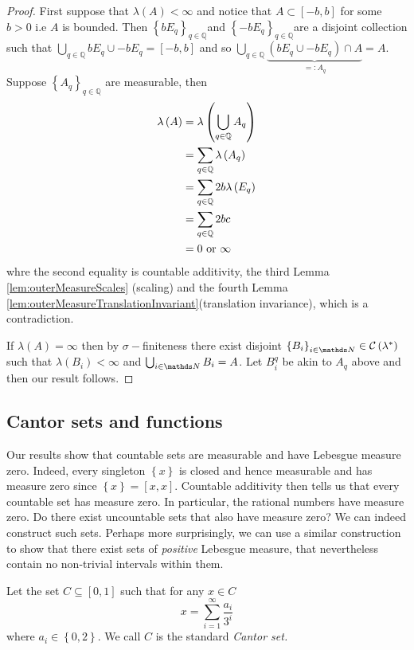 \begin{proof}
First suppose that $\lambda\left(A\right)<\infty$ and notice that
$A\subset\left[-b,b\right]$ for some $b>0$ i.e $A$ is bounded.
Then $\left\{ bE_{q}\right\} _{q\in\mathbb{Q}}$and $\left\{ -bE_{q}\right\} _{q\in\mathbb{Q}}$are
a disjoint collection such that $\bigcup_{q\in\mathbb{Q}}bE_{q}\cup-bE_{q}=\left[-b,b\right]$
and so $\bigcup_{q\in\mathbb{Q}}\underbrace{\left(bE_{q}\cup-bE_{q}\right)\cap A}_{=:A_{q}}=A$.
Suppose $\left\{ A_{q}\right\} _{q\in\mathbb{Q}}$ are measurable,
then
\begin{align*}
\lambda\left(A\right) & =\lambda\left(\bigcup_{q\in\mathbb{Q}}A_{q}\right)\\
 & =\sum_{q\in\mathbb{Q}}\lambda\left(A_{q}\right)\\
 & =\sum_{q\in\mathbb{Q}}2b\lambda\left(E_{q}\right)\\
 & =\sum_{q\in\mathbb{Q}}2bc\\
 & =0\ \text{or \ensuremath{\infty}}
\end{align*}
whre the second equality is countable additivity, the third Lemma
\ref{lem:outerMeasureScales} (scaling) and the fourth Lemma \ref{lem:outerMeasureTranslationInvariant}(translation
invariance), which is a contradiction.

If $\lambda\left(A\right)=\infty$ then by $\sigma-$finiteness there
exist disjoint $\left\{ B_{i}\right\} _{i\in\N}\in\mathcal{C}\left(\lambda^{*}\right)$
such that $\lambda\left(B_{i}\right)<\infty$ and $\bigcup_{i\in\N}B_{i}=A$.
Let $B_{i}^{q}$ be akin to $A_{q}$ above and then our result follows.
\end{proof}

\subsection{Cantor sets and functions\label{subsec:cantorSets}}

Our results show that countable sets are measurable and have Lebesgue
measure zero. Indeed, every singleton $\left\{ x\right\} $ is closed
and hence measurable and has measure zero since $\left\{ x\right\} =\left[x,x\right].$
Countable additivity then tells us that every countable set has measure
zero. In particular, the rational numbers have measure zero. Do there
exist uncountable sets that also have measure zero? We can indeed
construct such sets. Perhaps more surprisingly, we can use a similar
construction to show that there exist sets of \emph{positive }Lebesgue
measure, that nevertheless contain no non-trivial intervals within
them.
\begin{defn}
\label{def:cantorSet}Let the set $C\subseteq\left[0,1\right]$ such
that for any $x\in C$
\[
x=\sum_{i=1}^{\infty}\frac{a_{i}}{3^{i}}
\]
where $a_{i}\in\left\{ 0,2\right\} $. We call $C$ is the standard
\emph{Cantor set.}
\end{defn}

